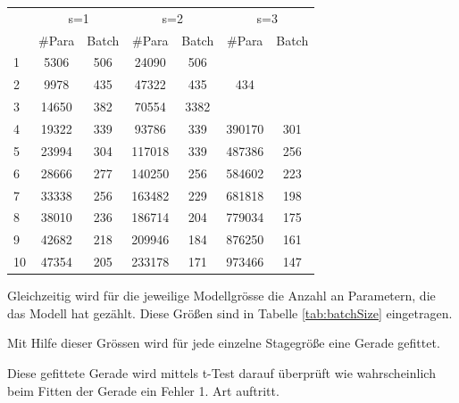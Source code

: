 \begin{table}[]
\begin{tabular}{c|c|c|c|c|c|c|}
\cline{2-7}
     & \multicolumn{2}{c|}{s=1}  & \multicolumn{2}{c|}{s=2}  & \multicolumn{2}{c|}{s=3}    \\ \cline{1-1}
\multicolumn{1}{|l|}{}   & \#Para      & Batch     & \#Para       & Batch     & \#Para & Batch  \\ \hline
\multicolumn{1}{|l|}{1}  & 5306        & 506       & 24090        & 506       \\ \hline
\multicolumn{1}{|l|}{2}  & 9978        & 435       & 47322        & 435       & 434        \\ \hline
\multicolumn{1}{|l|}{3}  & 14650       & 382       & 70554       & 3382        \\ \hline
\multicolumn{1}{|l|}{4}  & 19322       & 339       & 93786        & 339       & 390170      & 301        \\ \hline
\multicolumn{1}{|l|}{5}  & 23994       & 304       & 117018       & 339       & 487386      & 256        \\ \hline
\multicolumn{1}{|l|}{6}  & 28666       & 277       & 140250       & 256       & 584602      & 223        \\ \hline
\multicolumn{1}{|l|}{7}  & 33338       & 256       & 163482       & 229       & 681818      & 198        \\ \hline
\multicolumn{1}{|l|}{8}  & 38010       & 236       & 186714       & 204       & 779034      & 175        \\ \hline
\multicolumn{1}{|l|}{9}  & 42682       & 218       & 209946       & 184       & 876250      & 161        \\ \hline
 \multicolumn{1}{|l|}{10} & 47354      & 205       & 233178       & 171       & 973466      & 147        \\ \hline
\end{tabular}
\end{table}




Gleichzeitig wird für die jeweilige Modellgrösse die Anzahl an Parametern, die das Modell hat gezählt. Diese Größen sind in Tabelle \ref{tab:batchSize} eingetragen. 


Mit Hilfe dieser Grössen wird für jede einzelne Stagegröße eine Gerade gefittet.

Diese gefittete Gerade wird mittels t-Test darauf überprüft wie wahrscheinlich beim Fitten der Gerade ein Fehler 1. Art auftritt.

